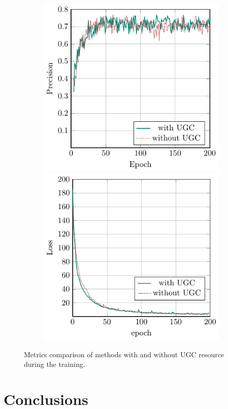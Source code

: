 \documentclass[conference]{IEEEtran}
\begin{document}
\begin{figure}[htb]
\begin{subfigure}[b]{\textwidth}
        \includegraphics[scale=0.7]{figures/ugc-exp-p}%
        \includegraphics[scale=0.7]{figures/ugc-exp-loss}
    \end{subfigure}
    \caption{Metrics comparison of methods with and without UGC resource during the training.}
    \label{fig:ugc-exp}
\end{figure}

\section{Conclusions}
\label{sec:conclusions}
\end{document}
